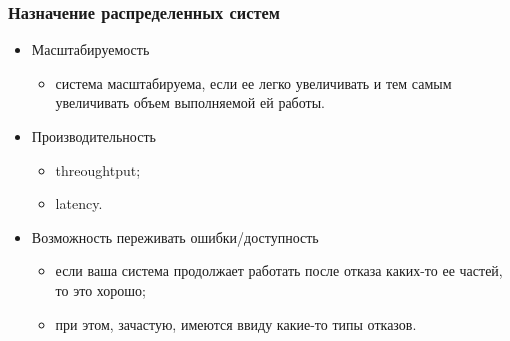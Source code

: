 \begin{frame}
\frametitle{Назначение распределенных систем}
\begin{itemize}
  \item Масштабируемость
  \begin{itemize}
    \item система масштабируема, если ее легко увеличивать и тем самым
    увеличивать объем выполняемой ей работы.
  \end{itemize}
  \item Производительность
  \begin{itemize}
    \item threoughtput;
    \item latency.
  \end{itemize}
  \item Возможность переживать ошибки/доступность
  \begin{itemize}
    \item если ваша система продолжает работать после отказа каких-то ее частей,
    то это хорошо;
    \item при этом, зачастую, имеются ввиду какие-то типы отказов.
  \end{itemize}
\end{itemize}
\end{frame}
